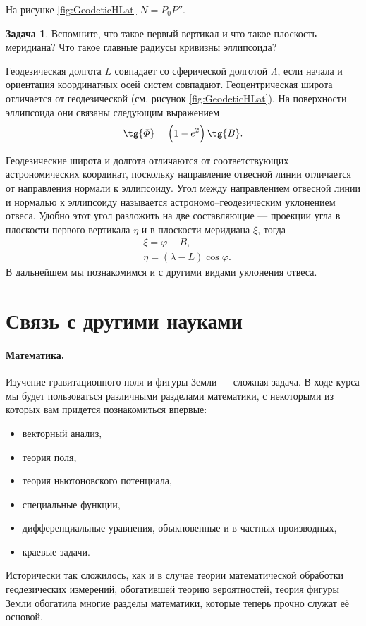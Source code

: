 \documentclass[11pt, a4paper]{article}
\theoremstyle{plain}
\theoremstyle{definition}
\newtheorem{problem}{Задача}[section]
\theoremstyle{remark}
\renewcommand{\phi}{\ensuremath{\varphi}}
\begin{document}
На рисунке \ref{fig:GeodeticHLat} $N = P_0 P''$.

\begin{problem}
    Вспомните, что такое первый вертикал и что такое плоскость меридиана? Что такое главные радиусы
    кривизны эллипсоида?
\end{problem}

Геодезическая долгота $L$ совпадает со сферической
долготой $\Lambda$, если начала и ориентация координатных осей систем совпадают. 
Геоцентрическая широта отличается от геодезической (см. рисунок \ref{fig:GeodeticHLat}). На поверхности эллипсоида они связаны следующим
выражением
\begin{equation*}
    \tg{\Phi} = \left( 1 - e^2 \right)\tg{B}.
\end{equation*}

Геодезические широта и долгота отличаются от соответствующих астрономических координат, поскольку
направление отвесной линии отличается от направления нормали к эллипсоиду. Угол между направлением
отвесной линии и нормалью к эллипсоиду называется астрономо--геодезическим уклонением отвеса.
Удобно этот угол разложить на две составляющие --- проекции угла в плоскости первого вертикала
$\eta$  и в плоскости меридиана $\xi$, тогда
\begin{align*}
    &\xi = \phi - B,\\
    &\eta = \left( \lambda - L \right)\cos\phi.
\end{align*}
В дальнейшем мы познакомимся и с другими видами уклонения отвеса.

\section{Связь с другими науками}
\paragraph{Математика.}
Изучение гравитационного поля и фигуры Земли --- сложная задача. В ходе курса мы будет пользоваться
различными разделами математики, с некоторыми из которых вам придется познакомиться впервые:
\begin{itemize}
    \item векторный анализ,
    \item теория поля,
    \item теория ньютоновского потенциала,
    \item специальные функции,
    \item дифференциальные уравнения, обыкновенные и в частных производных,
    \item краевые задачи.
\end{itemize}
Исторически так сложилось, как и в случае теории математической обработки геодезических
измерений, обогатившей теорию вероятностей, теория фигуры Земли обогатила многие разделы математики,
которые теперь прочно служат её основой.
\end{document}
